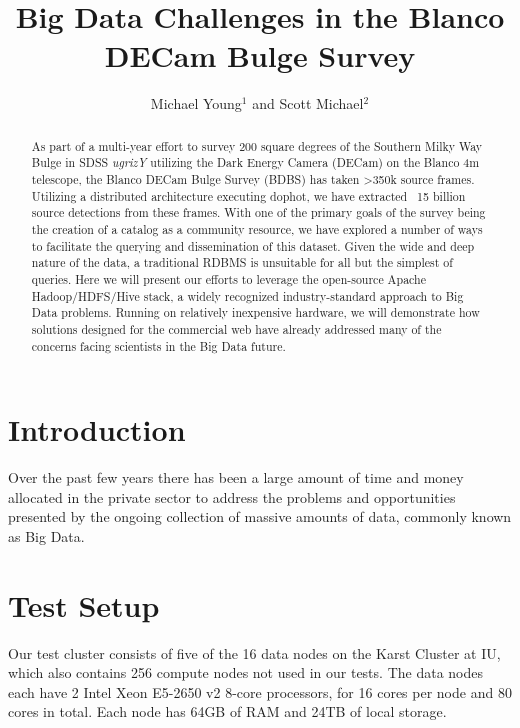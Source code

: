 \documentclass[11pt,twoside]{article}
\begin{document}
\title{Big Data Challenges in the Blanco DECam Bulge Survey}
\author{Michael Young$^1$ and Scott Michael$^2$
}


\begin{abstract}
As part of a multi-year effort to survey 200 square degrees of the Southern Milky Way Bulge in SDSS \textit{ugrizY} utilizing the Dark Energy Camera (DECam) on the Blanco 4m telescope, the Blanco DECam Bulge Survey (BDBS) has taken >350k source frames.  Utilizing a distributed architecture executing dophot, we have extracted ~15 billion source detections from these frames.  With one of the primary goals of the survey being the creation of a catalog as a community resource, we have explored a number of ways to facilitate the querying and dissemination of this dataset.  Given the wide and deep nature of the data, a traditional RDBMS is unsuitable for all but the simplest of queries.  Here we will present our efforts to leverage the open-source Apache Hadoop/HDFS/Hive stack, a widely recognized industry-standard approach to Big Data problems.  Running on relatively inexpensive hardware, we will demonstrate how solutions designed for the commercial web have already addressed many of the concerns facing scientists in the Big Data future.
\end{abstract}

\section{Introduction}
Over the past few years there has been a large amount of time and money allocated in the private sector to address the problems and opportunities presented by the ongoing collection of massive amounts of data, commonly known as Big Data.  

\section{Test Setup}

Our test cluster consists of five of the 16 data nodes on the Karst Cluster at IU, which also contains 256 compute nodes not used in our tests.  The data nodes each have 2 Intel Xeon E5-2650 v2 8-core processors, for 16 cores per node and 80 cores in total.  Each node has 64GB of RAM and 24TB of local storage.  
\end{document}
